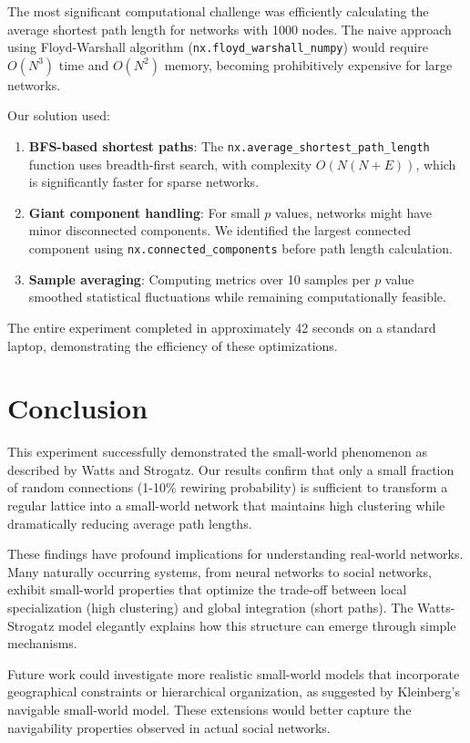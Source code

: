 \documentclass[11pt,a4paper]{article}
\begin{document}
The most significant computational challenge was efficiently calculating the average shortest path length for networks with 1000 nodes. The naive approach using Floyd-Warshall algorithm (\texttt{nx.floyd\_warshall\_numpy}) would require $O(N^3)$ time and $O(N^2)$ memory, becoming prohibitively expensive for large networks.

Our solution used:
\begin{enumerate}
    \item \textbf{BFS-based shortest paths}: The \texttt{nx.average\_shortest\_path\_length} function uses breadth-first search, with complexity $O(N(N+E))$, which is significantly faster for sparse networks.
    \item \textbf{Giant component handling}: For small $p$ values, networks might have minor disconnected components. We identified the largest connected component using \texttt{nx.connected\_components} before path length calculation.
    \item \textbf{Sample averaging}: Computing metrics over 10 samples per $p$ value smoothed statistical fluctuations while remaining computationally feasible.
\end{enumerate}

The entire experiment completed in approximately 42 seconds on a standard laptop, demonstrating the efficiency of these optimizations.

\section{Conclusion}
\indent

This experiment successfully demonstrated the small-world phenomenon as described by Watts and Strogatz. Our results confirm that only a small fraction of random connections (1-10\% rewiring probability) is sufficient to transform a regular lattice into a small-world network that maintains high clustering while dramatically reducing average path lengths.

These findings have profound implications for understanding real-world networks. Many naturally occurring systems, from neural networks to social networks, exhibit small-world properties that optimize the trade-off between local specialization (high clustering) and global integration (short paths). The Watts-Strogatz model elegantly explains how this structure can emerge through simple mechanisms.

Future work could investigate more realistic small-world models that incorporate geographical constraints or hierarchical organization, as suggested by Kleinberg's navigable small-world model. These extensions would better capture the navigability properties observed in actual social networks.
\end{document}
